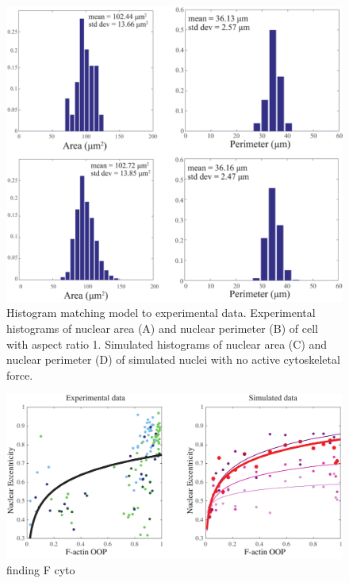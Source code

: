 \begin{figure}[h]
\centering
\captionsetup{width=.9\linewidth}
\includegraphics[width=7in]{Project3/figs/matching_histograms_areaandperim.eps}
\caption{Histogram matching model to experimental data. Experimental histograms of nuclear area (A) and nuclear perimeter (B) of cell with aspect ratio 1. Simulated histograms of nuclear area (C) and nuclear perimeter (D) of simulated nuclei with no active cytoskeletal force.}
\label{fig::histos}
\end{figure}

\begin{figure}[h]
\centering
\captionsetup{width=.9\linewidth}
\includegraphics[width=7in]{Project3/figs/EccentricityvsOOP.pdf}
\caption{finding F cyto}
\label{fig::eccopp}
\end{figure}

